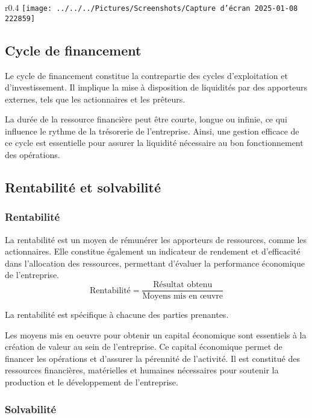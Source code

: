 \documentclass[a4paper, 12pt]{report}
\begin{document}
\begin{wrapfigure}{r}{0.4\textwidth}
	\centering
\texttt{[image: ../../../Pictures/Screenshots/Capture d'écran 2025-01-08 222859]}
\end{wrapfigure}

\subsection{Cycle de financement}

Le cycle de financement constitue la contrepartie des cycles d'exploitation et d'investissement. Il implique la mise à disposition de liquidités par des apporteurs externes, tels que les actionnaires et les prêteurs. 
		
La durée de la ressource financière peut être courte, longue ou infinie, ce qui influence le rythme de la trésorerie de l'entreprise. Ainsi, une gestion efficace de ce cycle est essentielle pour assurer la liquidité nécessaire au bon fonctionnement des opérations.

\subsection{Rentabilité et solvabilité}

\subsubsection{Rentabilité}

La rentabilité est un moyen de rémunérer les apporteurs de ressources, comme les actionnaires. Elle constitue également un indicateur de rendement et d'efficacité dans l'allocation des ressources, permettant d'évaluer la performance économique de l'entreprise.
\[ \text{Rentabilité} = \frac{\text{Résultat obtenu}}{\text{Moyens mis en œuvre}} \]

La rentabilité est spécifique à chacune des parties prenantes.

Les moyens mis en oeuvre pour obtenir un capital économique sont essentiels à la création de valeur au sein de l'entreprise. Ce capital économique permet de financer les opérations et d'assurer la pérennité de l'activité. Il est constitué des ressources financières, matérielles et humaines nécessaires pour soutenir la production et le développement de l'entreprise.

\subsubsection{Solvabilité}
\end{document}
